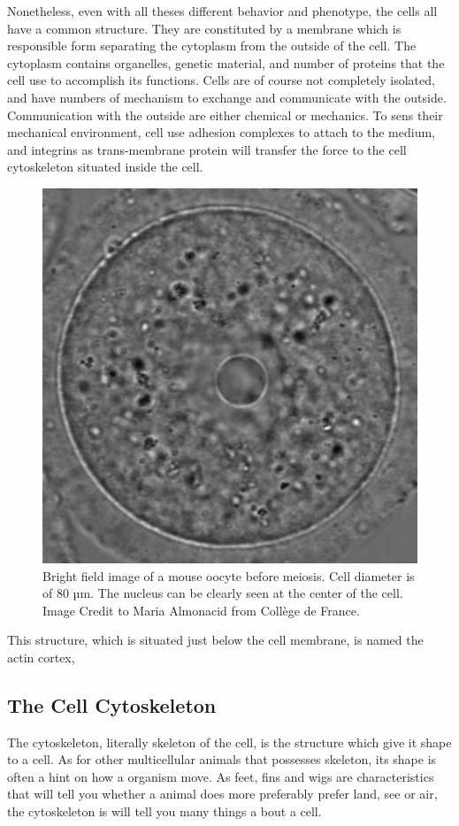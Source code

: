 \documentclass[A4paperpaper,11pt,english]{sphinxmanual}
\begin{document}
Nonetheless, even with all theses different behavior and phenotype, the cells
all have a common structure. They are constituted by a membrane which is
responsible form separating the cytoplasm from the outside of the cell. The
cytoplasm contains organelles, genetic material, and number of proteins that
the cell use to accomplish its functions. Cells are of course not completely
isolated, and have numbers of mechanism to exchange and communicate with the
outside. Communication with the outside are either chemical or mechanics.  To
sens their mechanical environment, cell use adhesion complexes to attach to the
medium, and integrins as trans-membrane protein will transfer the force to the
cell cytoskeleton situated inside the cell.
\begin{figure}[htbp]
\centering
\capstart

\includegraphics[width=0.700\linewidth]{oocyte-wild-type.png}
\caption{Bright field image of a mouse oocyte before meiosis. Cell diameter is
of 80 µm. The nucleus can be clearly seen at the center of the
cell. Image Credit to Maria Almonacid from Collège de France.}\label{parts/part1:oocytewt}\end{figure}

This structure, which is situated just below the cell membrane, is named the
actin cortex,


\subsection{The Cell Cytoskeleton}
\label{parts/part1:the-cell-cytoskeleton}
The cytoskeleton, literally skeleton of the cell, is the structure which give
it shape to a cell.  As for other multicellular animals that possesses
skeleton, its shape is often a hint on how a organism move. As feet, fins and
wigs are characteristics that will tell you whether a animal does more
preferably prefer land, see or air, the cytoskeleton is will tell you many
things a bout a cell.
\end{document}
